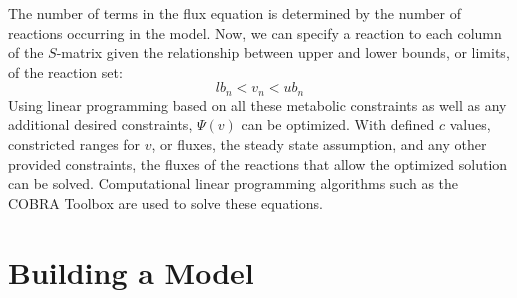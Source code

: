 The number of terms in the flux equation is determined by the number of reactions occurring in the model. Now, we can specify a reaction to each column of the $S$-matrix given the relationship between upper and lower bounds, or limits, of the reaction set:
$$lb_n<v_n<ub_n$$
\noindent
Using linear programming based on all these metabolic constraints as well as any additional desired constraints, $\Psi(v)$ can be optimized. With defined $c$ values, constricted ranges for $v$, or fluxes, the steady state assumption, and any other provided constraints, the fluxes of the reactions that allow the optimized solution can be solved. Computational linear programming algorithms such as the COBRA Toolbox are used to solve these equations.

\section{Building a Model}
